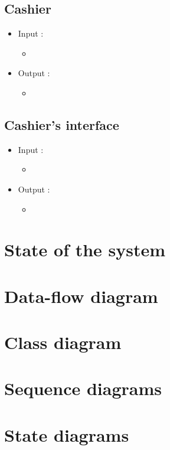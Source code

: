 \documentclass[11pt, a4paper]{article}
\begin{document}
\subsection{Cashier}

\begin{itemize}
\item Input :
		\begin{itemize}
		\item 
		\end{itemize}

\item Output :
		\begin{itemize}
		\item 
		\end{itemize}
\end{itemize}



\subsection{Cashier's interface}

\begin{itemize}
\item Input :
		\begin{itemize}
		\item 
		\end{itemize}

\item Output :
		\begin{itemize}
		\item 
		\end{itemize}
\end{itemize}



\section{State of the system}

\section{Data-flow diagram}

\section{Class diagram}

\section{Sequence diagrams}

\section{State diagrams}
\end{document}
